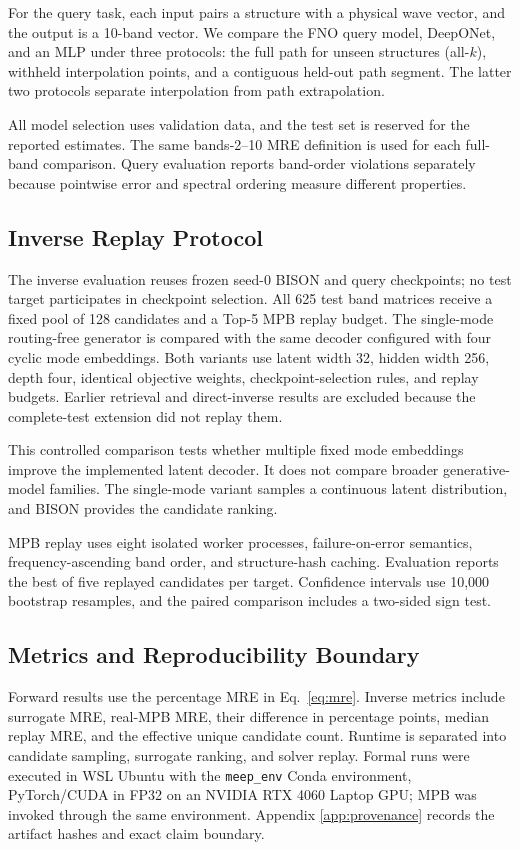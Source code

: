 For the query task, each input pairs a structure with a physical wave vector,
and the output is a 10-band vector. We compare the FNO query model, DeepONet,
and an MLP under three protocols: the full path for unseen structures
(all-\(k\)), withheld interpolation points, and a contiguous held-out path
segment. The latter two protocols separate interpolation from path
extrapolation.

All model selection uses validation data, and the test set is reserved for the
reported estimates. The same bands-2--10 MRE definition is used for each
full-band comparison. Query evaluation reports band-order violations
separately because pointwise error and spectral ordering measure different
properties.

\subsection{Inverse Replay Protocol}

The inverse evaluation reuses frozen seed-0 BISON and query checkpoints; no
test target participates in checkpoint selection. All 625 test band matrices
receive a fixed pool of 128 candidates and a Top-5 MPB replay budget. The
single-mode routing-free generator is compared with the same decoder configured
with four cyclic mode embeddings. Both variants use latent width 32, hidden
width 256, depth four, identical objective weights, checkpoint-selection
rules, and replay budgets. Earlier retrieval and direct-inverse results are
excluded because the complete-test extension did not replay them.

This controlled comparison tests whether multiple fixed mode embeddings
improve the implemented latent decoder. It does not compare broader
generative-model families. The single-mode variant samples a continuous latent
distribution, and BISON provides the candidate ranking.

MPB replay uses eight isolated worker processes, failure-on-error semantics,
frequency-ascending band order, and structure-hash caching. Evaluation reports
the best of five replayed candidates per target. Confidence intervals use
10,000 bootstrap resamples, and the paired comparison includes a two-sided
sign test.

\subsection{Metrics and Reproducibility Boundary}

Forward results use the percentage MRE in Eq.~\eqref{eq:mre}. Inverse metrics
include surrogate MRE, real-MPB MRE, their difference in percentage points,
median replay MRE, and the effective unique candidate count. Runtime is
separated into candidate sampling, surrogate ranking, and solver replay.
Formal runs were executed in WSL Ubuntu with the
\texttt{meep\_env} Conda environment, PyTorch/CUDA in FP32 on an NVIDIA RTX
4060 Laptop GPU; MPB was invoked through the same environment. Appendix
\ref{app:provenance} records the artifact hashes and exact claim boundary.
